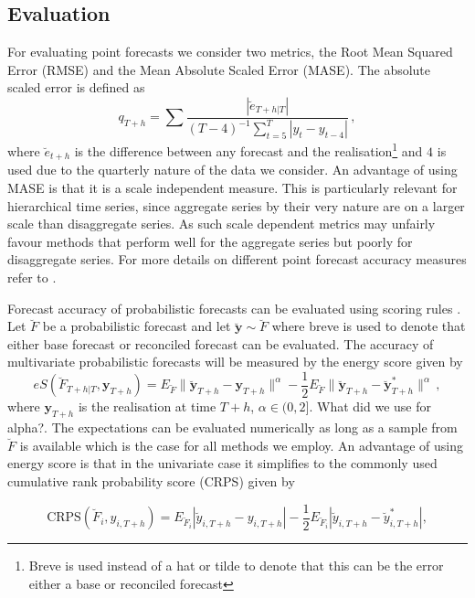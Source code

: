 \documentclass[graybox]{svmult}
\begin{document}
\subsection{Evaluation}

For evaluating point forecasts we consider two metrics, the Root Mean Squared Error (RMSE) and the Mean Absolute Scaled Error (MASE).  The absolute scaled error is defined as
\begin{equation*}
q_{T+h} = \sum \frac{|\breve{e}_{T+h|T}|}{(T-4)^{-1}\sum_{t=5}^{T}|y_t - y_{t-4}|}\,,
\end{equation*}
where $\breve{e}_{t+h}$ is the difference between any forecast and the realisation\footnote{Breve is used instead of a hat or tilde to denote that this can be the error either a base or reconciled forecast} and $4$ is used due to the quarterly nature of the data we consider.  An advantage of using MASE is that it is a scale independent measure. This is particularly relevant for hierarchical time series, since aggregate series by their very nature are on a larger scale than disaggregate series.  As such scale dependent metrics may unfairly favour methods that perform well for the aggregate series but poorly for disaggregate series.  For more details on different point forecast accuracy measures refer to \cite[Chapter 3 of][]{HynAth2018}.

Forecast accuracy of probabilistic forecasts can be evaluated using scoring rules \cite{Gneiting2014}.  Let $\breve{F}$ be a probabilistic forecast and let $\breve{\bm{y}}\sim \breve{F}$  where breve is used to denote that either base forecast or reconciled forecast can be evaluated.  The accuracy of multivariate probabilistic forecasts will be measured by the energy score given by
\begin{equation*}
eS(\breve{F}_{T+h|T},\bm{y}_{T+h}) =
E_{\breve{F}}\|\breve{\bm{y}}_{T+h}-\bm{y}_{T+h}\|^\alpha
-\frac{1}{2}E_{\breve{F}}\|\breve{\bm{y}}_{T+h}-\breve{\bm{y}}^*_{T+h}\|^\alpha\,,
\end{equation*} where $\bm{y}_{T+h}$ is the realisation at time $T+h$, $\alpha\in (0,2]$. {\color{red} What did we use for alpha?}.  The expectations can be evaluated numerically as long as a sample from $\breve{F}$ is available which is the case for all methods we employ.  An advantage of using energy score is that in the univariate case it simplifies to the commonly used cumulative rank probability score (CRPS) given by

\begin{equation*} 
\text{CRPS}(\breve{F}_i,y_{i,T+h}) = E_{\breve{F}_i}|\breve{y}_{i,T+h}-y_{i,T+h}| - \frac{1}{2}E_{\breve{F}_i}|\breve{y}_{i,T+h}-\breve{y}^*_{i,T+h}|,
\end{equation*}
\end{document}
